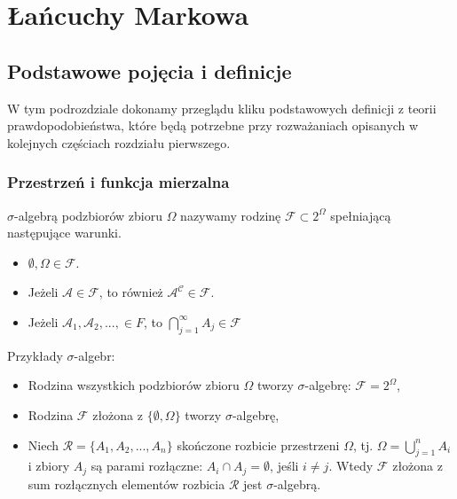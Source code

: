 \chapter{Łańcuchy Markowa}

\section{Podstawowe pojęcia i definicje}
W tym podrozdziale dokonamy przeglądu kliku podstawowych definicji z teorii prawdopodobieństwa, które będą potrzebne przy rozważaniach opisanych w kolejnych częściach rozdziału pierwszego.

\subsection{Przestrzeń i funkcja mierzalna}

\begin{definicja}
	$\sigma$-algebrą podzbiorów zbioru $\Omega$ nazywamy rodzinę $\mathcal{F} \subset	2^{\Omega}$ spełniającą następujące warunki.
	\begin{itemize}
		\item $\emptyset, \Omega \in \mathcal{F}$.
		\item Jeżeli $ \mathcal{A} \in \mathcal{F}$, to również $\mathcal{A^{C}} \in \mathcal{F}$.
		\item Jeżeli $ \mathcal{A}_{1} , \mathcal{A}_{2} , ..., \in F$, to $\bigcap_{j=1}^{\infty} A_{j} \in \mathcal{F}$	
	\end{itemize}
\end{definicja}

\begin{przyklad}
	Przykłady $\sigma$-algebr:
	\begin{itemize}
		\item Rodzina wszystkich podzbiorów zbioru $\Omega$ tworzy $\sigma$-algebrę: $\mathcal{F} = 2^{\Omega}$,
		\item Rodzina $\mathcal{F}$ złożona z $\{\emptyset, \Omega \}$ tworzy $\sigma$-algebrę,
		\item Niech $\mathcal{R} = \{ A_{1}, A_{2}, ..., A_{n} \}$ skończone rozbicie przestrzeni $\Omega$, tj. $\Omega = \bigcup\limits_{j=1}^{n} A_{i}$ i zbiory $A_{j}$ są parami rozłączne: $A_{i} \cap A_{j} = \emptyset$, jeśli $i \neq j$. Wtedy $\mathcal{F}$ złożona z sum rozłącznych elementów rozbicia $\mathcal{R}$ jest $\sigma$-algebrą.		
	\end{itemize}
\end{przyklad}


